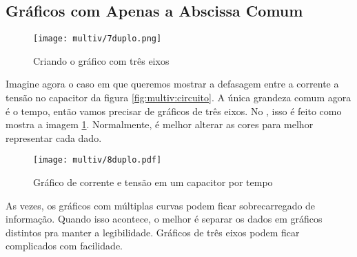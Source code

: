 \subsection{Gráficos com Apenas a Abscissa Comum}

    \begin{figure}[htbp]
        \centering
        \texttt{[image: multiv/7duplo.png]}

        \caption{Criando o gráfico com três eixos}
        \label{fig:multiv:duplo:tutorial}
    \end{figure}

    Imagine agora o caso em que queremos mostrar a defasagem entre a corrente a tensão no capacitor da figura \ref{fig:multiv:circuito}. A única grandeza comum agora é o tempo, então vamos precisar de gráficos de três eixos. No \software, isso é feito como mostra a imagem \ref{fig:multiv:duplo:tutorial}. Normalmente, é melhor alterar as cores para melhor representar cada dado.

    \begin{figure}[htbp]
        \centering
        \texttt{[image: multiv/8duplo.pdf]}

        \caption{Gráfico de corrente e tensão em um capacitor por tempo}
        \label{fig:multiv:duplo}
    \end{figure}

    \begin{nota}
        As vezes, os gráficos com múltiplas curvas podem ficar sobrecarregado de informação. Quando isso acontece, o melhor é separar os dados em gráficos distintos pra manter a legibilidade. Gráficos de três eixos podem ficar complicados com facilidade.
    \end{nota}
